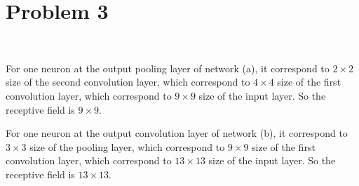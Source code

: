 \section{Problem 3}~\label{sec:prob3}

For one neuron at the output pooling layer of network (a),
it correspond  to $2\times 2$ size of the second convolution layer,
which correspond to $4\times 4$ size of the first convolution layer,
which correspond to $9\times 9$ size of the input layer.
So the receptive field is $9\times 9$.

For one neuron at the output convolution layer of network (b),
it correspond  to $3\times 3$ size of the pooling layer,
which correspond to $9\times 9$ size of the first convolution layer,
which correspond to $13\times 13$ size of the input layer.
So the receptive field is $13\times 13$.
